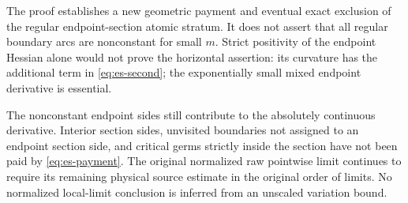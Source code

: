 \begin{remark}
\label{rem:es-scope}
The proof establishes a new geometric payment and eventual exact
exclusion of the regular endpoint-section atomic stratum.  It
does not assert that all regular boundary arcs are nonconstant
for small $m$.  Strict positivity of the endpoint Hessian alone
would not prove the horizontal assertion: its curvature has the
additional term in \eqref{eq:es-second}; the exponentially small
mixed endpoint derivative is essential.

The nonconstant endpoint sides still contribute to the absolutely
continuous derivative.  Interior section sides, unvisited
boundaries not assigned to an endpoint section side, and critical
germs strictly inside the section have not been paid by
\eqref{eq:es-payment}.  The original normalized raw pointwise
limit continues to require its remaining physical source estimate
in the original order of limits.  No normalized local-limit
conclusion is inferred from an unscaled variation bound.
\end{remark}
